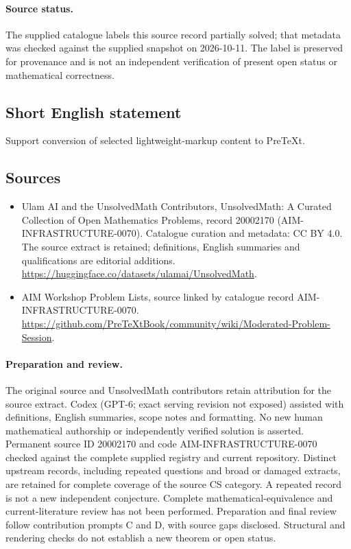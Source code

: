\documentclass[11pt]{article}
\begin{document}
\paragraph{Source status.}
The supplied catalogue labels this source record partially solved; that metadata was checked against the supplied snapshot on 2026-10-11. The label is preserved for provenance and is not an independent verification of present open status or mathematical correctness.
\subsection{Short English statement}
Support conversion of selected lightweight-markup content to PreTeXt.
\subsection{Sources}
\begin{itemize}
\item[\hypertarget{source:20002170:1}{S1}] Ulam AI and the UnsolvedMath Contributors, UnsolvedMath: A Curated Collection of Open Mathematics Problems, record 20002170 (AIM-INFRASTRUCTURE-0070). Catalogue curation and metadata: CC BY 4.0. The source extract is retained; definitions, English summaries and qualifications are editorial additions.
\url{https://huggingface.co/datasets/ulamai/UnsolvedMath}.
\item[\hypertarget{source:20002170:2}{S2}] AIM Workshop Problem Lists, source linked by catalogue record AIM-INFRASTRUCTURE-0070.
\url{https://github.com/PreTeXtBook/community/wiki/Moderated-Problem-Session}.
\end{itemize}
\paragraph{Preparation and review.}
The original source and UnsolvedMath contributors retain attribution for the source extract. Codex (GPT-6; exact serving revision not exposed) assisted with definitions, English summaries, scope notes and formatting. No new human mathematical authorship or independently verified solution is asserted. Permanent source ID 20002170 and code AIM-INFRASTRUCTURE-0070 checked against the complete supplied registry and current repository. Distinct upstream records, including repeated questions and broad or damaged extracts, are retained for complete coverage of the source CS category. A repeated record is not a new independent conjecture. Complete mathematical-equivalence and current-literature review has not been performed. Preparation and final review follow contribution prompts C and D, with source gaps disclosed. Structural and rendering checks do not establish a new theorem or open status.
\label{end:20002170}
\end{document}
